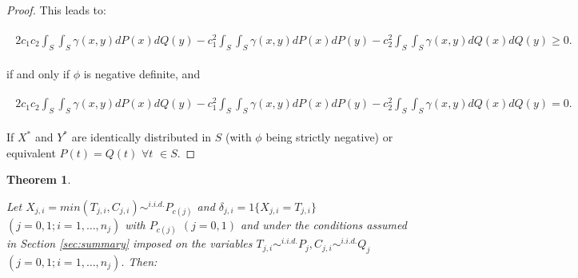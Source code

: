 \documentclass[11pt]{article}
\newtheorem{theorem}{Theorem}
\begin{document}
\begin{appendices}
\begin{proof}
	This leads to:
	
	
	\begin{gather}
	\begin{align*}
	2c_1c_2\int_S \int_S \gamma(x,y)dP(x) dQ(y)-	c_1^{2}\int_S \int_S \gamma(x,y)dP(x) dP(y)-c_2^{2}\int_S \int_S \gamma(x,y)dQ(x) dQ(y)\geq 0.
	\end{align*}
		\end{gather}
	
	
	if and only if $\phi$ is negative definite,  and 
	
		\begin{gather}	
	\begin{align*}
	2c_1c_2\int_S \int_S \gamma(x,y)dP(x) dQ(y)-	c_1^{2}\int_S \int_S \gamma(x,y)dP(x) dP(y)-c_2^{2}\int_S \int_S \gamma(x,y)dQ(x) dQ(y)= 0.
	\end{align*}
			\end{gather}
	
	If $X^{*}$ and $Y^{*}$ are identically distributed in $S$ (with $\phi$ being  strictly negative) or equivalent $P(t)= Q(t)$ $\forall t$  $\in S$.
	
	
	
	
\end{proof}





\begin{theorem}{\label{consistencia}}
	
	Let $X_{j,i}= min(T_{j,i},C_{j,i})\sim^{i.i.d. } P_{c(j)} $ and  $\delta_{j,i}= 1\{X_{j,i}= T_{j,i}\}$	$(j=0,1; i=1,\dots,n_j)$ with $P_{c(j)}$ $(j=0,1)$ and under the conditions  assumed in Section \ref{sec:summary} imposed on the variables $T_{j,i}\sim^{i.i.d.} P_{j},C_{j,i}\sim^{i.i.d.} Q_{j}$ $(j=0,1; i=1,\dots,n_j)$. Then:
	

\end{theorem}
\end{appendices}
\end{document}
